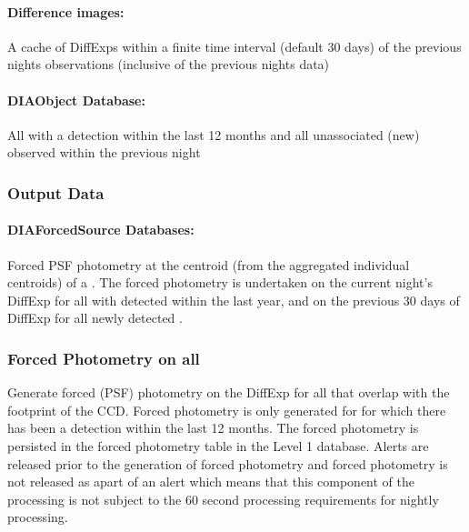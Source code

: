 \paragraph*{Difference images:} A cache of DiffExps within a finite time interval (default 30 days) of the previous nights observations (inclusive of the previous nights data)

\paragraph*{DIAObject Database:} All \DIAObjects with a \DIASource detection within the last 12 months and all unassociated (new) \DIAObjects observed within the previous night


\subsubsection{Output Data}

\paragraph*{DIAForcedSource Databases:} Forced PSF photometry at the centroid (from the aggregated individual \DIASource centroids) of a \DIAObject. The forced photometry is undertaken on the current night's DiffExp for all \DIAObjects with \DIASources detected within the last year, and on the previous 30 days of DiffExp for all newly detected \DIASources.


\subsubsection{Forced Photometry on all \DIAObjects}

Generate forced (PSF) photometry on the DiffExp for all \DIAObjects that overlap with the footprint of the CCD. Forced photometry is only generated for \DIAObjects for which there has been a \DIASource detection within the last 12 months. The forced photometry is persisted in the forced photometry table in the Level 1 database. Alerts are released prior to the generation of forced photometry and forced photometry is not released as apart of an alert which means that this component of the processing is not subject to the 60 second processing requirements for nightly processing.

